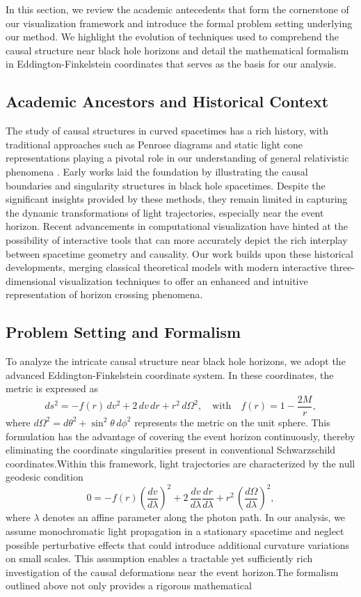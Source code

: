 \documentclass{article}
\begin{document}
In this section, we review the academic antecedents that form the cornerstone of our visualization framework and introduce the formal problem setting underlying our method. We highlight the evolution of techniques used to comprehend the causal structure near black hole horizons and detail the mathematical formalism in Eddington-Finkelstein coordinates that serves as the basis for our analysis.\subsection{Academic Ancestors and Historical Context}The study of causal structures in curved spacetimes has a rich history, with traditional approaches such as Penrose diagrams and static light cone representations playing a pivotal role in our understanding of general relativistic phenomena \cite{ref1}. Early works laid the foundation by illustrating the causal boundaries and singularity structures in black hole spacetimes. Despite the significant insights provided by these methods, they remain limited in capturing the dynamic transformations of light trajectories, especially near the event horizon. Recent advancements in computational visualization have hinted at the possibility of interactive tools that can more accurately depict the rich interplay between spacetime geometry and causality. Our work builds upon these historical developments, merging classical theoretical models with modern interactive three-dimensional visualization techniques to offer an enhanced and intuitive representation of horizon crossing phenomena.\subsection{Problem Setting and Formalism}To analyze the intricate causal structure near black hole horizons, we adopt the advanced Eddington-Finkelstein coordinate system. In these coordinates, the metric is expressed as\begin{equation}ds^2 = -f(r)\, dv^2 + 2\, dv\, dr + r^2\, d\Omega^2, \quad \text{with} \quad f(r)=1-\frac{2M}{r},\end{equation}where \(d\Omega^2 = d\theta^2+\sin^2\theta\, d\phi^2\) represents the metric on the unit sphere. This formulation has the advantage of covering the event horizon continuously, thereby eliminating the coordinate singularities present in conventional Schwarzschild coordinates.Within this framework, light trajectories are characterized by the null geodesic condition\begin{equation}0 = -f(r)\left(\frac{dv}{d\lambda}\right)^2 + 2\,\frac{dv}{d\lambda}\frac{dr}{d\lambda} + r^2\,\left(\frac{d\Omega}{d\lambda}\right)^2, \label{eq:nullgeodesic}\end{equation}where \(\lambda\) denotes an affine parameter along the photon path. In our analysis, we assume monochromatic light propagation in a stationary spacetime and neglect possible perturbative effects that could introduce additional curvature variations on small scales. This assumption enables a tractable yet sufficiently rich investigation of the causal deformations near the event horizon.The formalism outlined above not only provides a rigorous mathematical 
\end{document}
